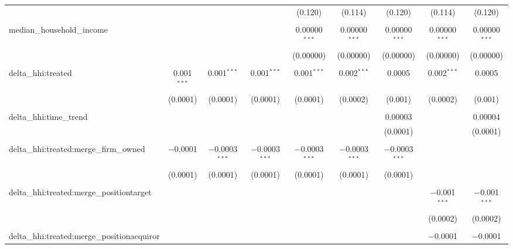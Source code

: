 \begin{table}[H]
{\begin{tabular}{@{\extracolsep{5pt}}lcccccccc}
   &  &  &  & (0.120) & (0.114) & (0.120) & (0.114) & (0.120) \\  

   & & & & & & & & \\  

  median\_household\_income &  &  &  & 0.00000$^{***}$ & 0.00000$^{***}$ & 0.00000$^{***}$ & 0.00000$^{***}$ & 0.00000$^{***}$ \\  

   &  &  &  & (0.00000) & (0.00000) & (0.00000) & (0.00000) & (0.00000) \\  

   & & & & & & & & \\  

  delta\_hhi:treated & 0.001$^{***}$ & 0.001$^{***}$ & 0.001$^{***}$ & 0.001$^{***}$ & 0.002$^{***}$ & 0.0005 & 0.002$^{***}$ & 0.0005 \\  

   & (0.0001) & (0.0001) & (0.0001) & (0.0001) & (0.0002) & (0.001) & (0.0002) & (0.001) \\  

   & & & & & & & & \\  

  delta\_hhi:time\_trend &  &  &  &  &  & 0.00003 &  & 0.00004 \\  

   &  &  &  &  &  & (0.0001) &  & (0.0001) \\  

   & & & & & & & & \\  

  delta\_hhi:treated:merge\_firm\_owned & $-$0.0001 & $-$0.0003$^{***}$ & $-$0.0003$^{***}$ & $-$0.0003$^{***}$ & $-$0.0003$^{***}$ & $-$0.0003$^{***}$ &  &  \\  

   & (0.0001) & (0.0001) & (0.0001) & (0.0001) & (0.0001) & (0.0001) &  &  \\  

   & & & & & & & & \\  

  delta\_hhi:treated:merge\_positiontarget &  &  &  &  &  &  & $-$0.001$^{***}$ & $-$0.001$^{***}$ \\  

   &  &  &  &  &  &  & (0.0002) & (0.0002) \\  

   & & & & & & & & \\  

  delta\_hhi:treated:merge\_positionacquiror &  &  &  &  &  &  & $-$0.0001 & $-$0.0001 \\  


\end{tabular}}
\end{table}
